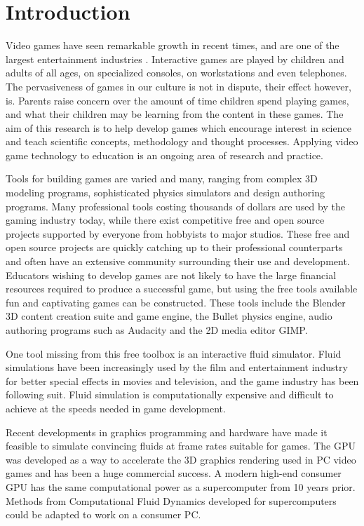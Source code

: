 \chapter{Introduction}
\label{chapter:introduction}

Video games have seen remarkable growth in recent times, and are one of the
largest entertainment industries \cite{Kafai2006}. Interactive games are played by
children and adults of all ages, on specialized consoles, on workstations and
even telephones. The pervasiveness of games in our culture is not in dispute,
their effect however, is.\cite{Ferguson2007} Parents raise concern over the amount of time
children spend playing games, and what their children may be learning from the
content in these games. The aim of this research is to help develop games which
encourage interest in science and teach scientific concepts, methodology and
thought processes. Applying video game technology to education is an ongoing
area of research and practice\cite{Hayes2008}. 


Tools for building games are varied and many, ranging from complex 3D modeling
programs, sophisticated physics simulators and design authoring programs. Many
professional tools costing thousands of dollars are used by the gaming industry
today, while there exist competitive free and open source projects supported by
everyone from hobbyists to major studios. These free and open source projects
are quickly catching up to their professional counterparts and often have an
extensive community surrounding their use and development. Educators wishing to
develop games are not likely to have the large financial resources required to
produce a successful game, but using the free tools available fun and
captivating games can be constructed. These tools include the Blender 3D
content creation suite and game engine, the Bullet physics engine, audio
authoring programs such as Audacity and the 2D media editor GIMP. 


One tool missing from this free toolbox is an interactive fluid simulator.
Fluid simulations have been increasingly used by the film and entertainment
industry for better special effects in movies and television, and the game
industry has been following suit. Fluid simulation is computationally expensive
and difficult to achieve at the speeds needed in game development. 

Recent developments in graphics programming and hardware have made it feasible
to simulate convincing fluids at frame rates suitable for games. The GPU was
developed as a way to accelerate the 3D graphics rendering used in PC video
games and has been a huge commercial success. A modern high-end consumer GPU
has the same computational power as a supercomputer from 10 years prior.
Methods from Computational Fluid Dynamics developed for supercomputers could be
adapted to work on a consumer PC.


